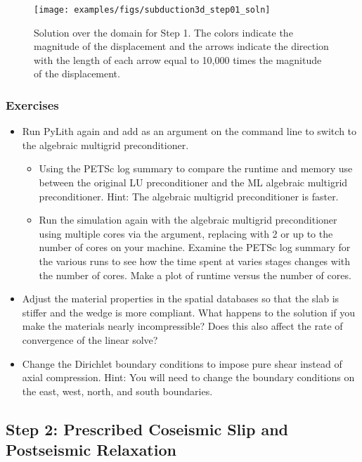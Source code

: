 \begin{figure}
  \texttt{[image: examples/figs/subduction3d\_step01\_soln]}
  \caption{Solution over the domain for Step 1. The colors indicate
    the magnitude of the displacement and the arrows indicate the
    direction with the length of each arrow equal to 10,000 times the
    magnitude of the displacement.}
  \label{fig:example:subduction:3d:step01}
\end{figure}

\subsubsection{Exercises}

\begin{itemize}
\item Run PyLith again and add
   as an argument on the
  command line to switch to the algebraic multigrid preconditioner.
  \begin{itemize}
  \item Using the PETSc log summary to compare the runtime and memory
    use between the original LU preconditioner and the ML algebraic
    multigrid preconditioner. Hint: The algebraic multigrid
    preconditioner is faster.
  \item Run the simulation again with the algebraic multigrid
    preconditioner using multiple cores via the
     argument, replacing
     with 2 or up to the number of cores on your
    machine. Examine the PETSc log summary for the various runs to see
    how the time spent at varies stages changes with the number of
    cores. Make a plot of runtime versus the number of cores.
  \end{itemize}
\item Adjust the material properties in the spatial databases so that
  the slab is stiffer and the wedge is more compliant. What happens to
  the solution if you make the materials nearly incompressible? Does
  this also affect the rate of convergence of the linear solve?
\item Change the Dirichlet boundary conditions to impose pure shear
  instead of axial compression. Hint: You will need to change the
  boundary conditions on the east, west, north, and south boundaries.
\end{itemize}
    

\subsection{Step 2: Prescribed Coseismic Slip and Postseismic Relaxation}
\label{sec:example:subduction:3d:step02}


